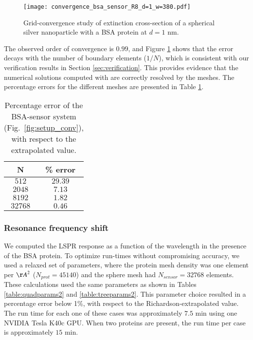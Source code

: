 \begin{figure}[h] %
   \centering
   \texttt{[image: convergence\_bsa\_sensor\_R8\_d=1\_w=380.pdf]} 
   \caption{Grid-convergence study of extinction cross-section of a spherical silver
            nanoparticle with a BSA protein at $d=1$ nm.}
   \label{fig:error_sphere-bsa}
\end{figure}

The observed order of convergence is $0.99$, and 
Figure \ref{fig:error_sphere-bsa} shows that the error decays with the number
of boundary elements ($1/N$), which is consistent with our verification 
results in Section \ref{sec:verification}. This provides evidence that the
numerical solutions computed with \pygbe are correctly resolved by the meshes.
The percentage errors for the different meshes are presented in Table \ref{table:err_bsa_sensor}.

\begin{table}[h]
    \centering
    \caption{\label{table:err_bsa_sensor} Percentage error of the BSA-sensor system (Fig.~\ref{fig:setup_conv}), with respect to the extrapolated value.} 
    \begin{tabular}{c c}
    \hline%
    N & \% error \\
    \hline%
     $512$ & $29.39$ \\
     $2048$ & $7.13$ \\
     $8192$ & $1.82$ \\
     $32768$ & $0.46$ \\
    \hline%
    \end{tabular}
\end{table}

\subsubsection{Resonance frequency shift} \label{sec:bsa_shift}

We computed the LSPR response as a function of the wavelength in the presence 
of the BSA protein. To optimize run-times without compromising accuracy, we used a relaxed
set of parameters, where the protein mesh density was one element per
${\AA}^2$ ($N_{prot}=45140$) and the sphere mesh had $N_{sensor}=32768$ elements. 
These calculations used the same parameters as shown in Tables \ref{table:quadparams2} and \ref{table:treeparams2}.
This parameter choice resulted in a percentage error below 1\%, with respect to the Richardson-extrapolated value.
The run time for each one of these cases was approximately $7.5$ min using one NVIDIA Tesla K40c GPU. 
When two proteins are present, the run time per case is approximately  $15$ min. 

